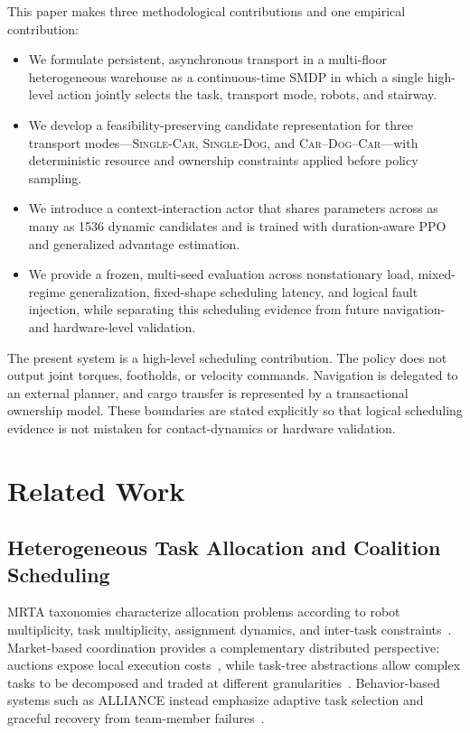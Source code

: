 \documentclass[journal]{IEEEtran}
\DeclareRobustCommand{\modecar}{\mbox{\textsc{Single-Car}}\xspace}
\DeclareRobustCommand{\modedog}{\mbox{\textsc{Single-Dog}}\xspace}
\DeclareRobustCommand{\modechain}{\mbox{\textsc{Car--Dog--Car}}\xspace}
\begin{document}
This paper makes three methodological contributions and one empirical contribution:
\begin{itemize}
  \item We formulate persistent, asynchronous transport in a multi-floor heterogeneous warehouse as a continuous-time SMDP in which a single high-level action jointly selects the task, transport mode, robots, and stairway.
  \item We develop a feasibility-preserving candidate representation for three transport modes---\modecar, \modedog, and \modechain---with deterministic resource and ownership constraints applied before policy sampling.
  \item We introduce a context-interaction actor that shares parameters across as many as 1536 dynamic candidates and is trained with duration-aware PPO and generalized advantage estimation.
  \item We provide a frozen, multi-seed evaluation across nonstationary load, mixed-regime generalization, fixed-shape scheduling latency, and logical fault injection, while separating this scheduling evidence from future navigation- and hardware-level validation.
\end{itemize}

The present system is a high-level scheduling contribution. The policy does not output joint torques, footholds, or velocity commands. Navigation is delegated to an external planner, and cargo transfer is represented by a transactional ownership model. These boundaries are stated explicitly so that logical scheduling evidence is not mistaken for contact-dynamics or hardware validation.

\section{Related Work}
\label{sec:related_work}

\subsection{Heterogeneous Task Allocation and Coalition Scheduling}

MRTA taxonomies characterize allocation problems according to robot multiplicity, task multiplicity, assignment dynamics, and inter-task constraints~\cite{gerkey2004taxonomy,korsah2013taxonomy}. Market-based coordination provides a complementary distributed perspective: auctions expose local execution costs~\cite{dias2006market}, while task-tree abstractions allow complex tasks to be decomposed and traded at different granularities~\cite{zlot2006market}. Behavior-based systems such as ALLIANCE instead emphasize adaptive task selection and graceful recovery from team-member failures~\cite{parker1994alliance}.
\end{document}
